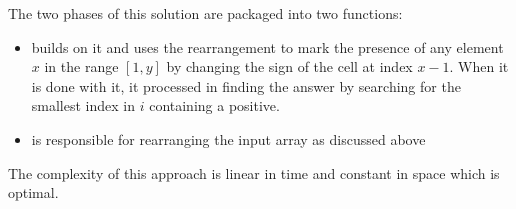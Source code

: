 The two phases of this solution are packaged into two functions:
\begin{itemize}
	\item {} builds on it and uses the rearrangement to mark the presence of any element $x$ in the range $[1,y]$ by changing the sign of the cell at index $x-1$. When it is done with it, it processed in finding the answer by searching for the smallest index in $i$ containing a positive.
	\item {} is responsible for rearranging the input array as discussed above
\end{itemize}

The complexity of this approach is linear in time and constant in space which is optimal.